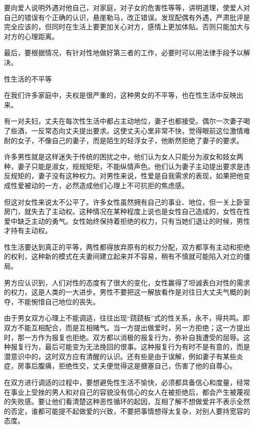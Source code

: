 \documentclass[12pt,UTF8]{ctexbook}
\begin{document}
要向爱人说明外遇对他自己，对家庭，对子女的危害性等等，讲明道理，使爱人对自己的错误有个正确的认识，悬崖勒马，改正错误。发现配偶有外遇，严肃批评是完全应该的，但同时在生活上要更加关心对方，感情上更加体贴。否则只能加大与对方的心理距离。

最后，要根据情况，有针对性地做好第三者的工作，必要时可以用法律手段予以解决。





性生活的不平等


在我们许多家庭中，夫权是很严重的，这种男女的不平等，也在性生活中反映出来。

有一对夫妇，丈夫在每次性生活中都占主动地位，妻子也都接受。偶尔一次妻子喝了些酒，一反常态向丈夫提出要求。这使丈夫心里非常不快，觉得眼前这位激情难耐的女子，不像自己的妻子，而是陌生的轻浮女子，他断然拒绝了妻子的要求。

许多男性就是这样迷失于传统的困扰之中，他们认为女人只能分为淑女和妓女两种，妻子只能是淑女，规规矩矩，不能纵情声色。他们认为妻子主动提出要求是违反规矩的，妻子没有这种权力。对男性来说，性爱是自我需求的表现，如果把他变成性爱被动的一方，必然造成他们心理上不可抗拒的焦虑感。

但这对女性来说太不公平了。许多女性虽然拥有自己的事业、地位，但一关上卧室房门，就失去了主动权。这种情况在某种程度上说也是女性自己造成的，女性在性爱中缺乏主动的勇气。女性始终保持着拒绝的权力，只有当她们退让的时候，男性才持有主动权。

性生活要达到真正的平等，两性都得放弃原有的权力分配，双方都享有主动和拒绝的权利，这种新的模式在夫妻间建立起来并不容易，稍有不慎就可能陷入对立的僵局。

男方应认识到，人们对性的态度有了很大的变化，女性赢得了坦诚表白对性的需求的权力，这是人类的一大进步。男性不要把这一解放看作是对往日大丈夫气概的剥夺，不能惋惜自己地位的丧失。

由于男女双方心理上不能调适，往往出现“跷跷板”式的性关系，永不，得共鸣。即双方不能互相配合，而是互相赌气。当一方提出做爱时，另一方拒绝；这一方提出时，那一方作为报复也拒绝。双方都以消极的报复行为，弥补自我遭受的屈辱。这种报复行为，最后可能变为无法挽回的恨事。这种报复行为有时不是有意的，而是潜意识中的，这时双方应有清醒的认识。还有些是由于误解，例如妻子有某些炎症，房事后腹痛，拒绝性交，丈夫便觉得这是搪塞自己，伤害了他的自尊心。

在双方进行调适的过程中，要想避免性生活不愉快，必须都具备信心和度量，经常在事业上受挫的男人和对自己的容貌没有信心的女人在被拒绝后，都会产生被蔑视的失败感。要让他们看清楚这种恶性循环的起因，互相了解不想做爱并不表示全然的否定，谁都可能提不起做爱的兴致，不要把事情想得太复杂，对别人要持宽容的态度。
\end{document}
